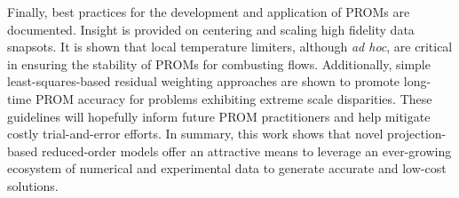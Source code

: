 Finally, best practices for the development and application of PROMs are documented. Insight is provided on  centering and scaling high fidelity data snapsots. It is shown that local temperature limiters, although \textit{ad hoc}, are critical in ensuring the stability of PROMs for combusting flows. Additionally, simple least-squares-based residual weighting approaches are shown to promote long-time PROM accuracy for problems exhibiting extreme scale disparities. These guidelines will hopefully inform future PROM practitioners and help mitigate costly trial-and-error efforts. In summary, this work shows that  novel projection-based reduced-order models offer an attractive means to leverage an ever-growing ecosystem of numerical and experimental data to generate accurate and low-cost  solutions.
